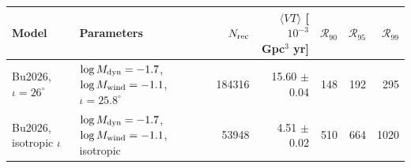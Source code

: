 \begin{tabular}{llrrrrr}
\toprule
Model & Parameters & $N_{\rm rec}$ & $\langle VT\rangle$ [$10^{-3}$ Gpc$^3$ yr] & $\mathcal{R}_{90}$ & $\mathcal{R}_{95}$ & $\mathcal{R}_{99}$ \\
\midrule
Bu2026, $\iota=26^\circ$ & $\log M_{\rm dyn}=-1.7$, $\log M_{\rm wind}=-1.1$, $\iota=25.8^\circ$ & 184316 & 15.60 $\pm$ 0.04 & 148 & 192 & 295 \\
Bu2026, isotropic $\iota$ & $\log M_{\rm dyn}=-1.7$, $\log M_{\rm wind}=-1.1$, isotropic & 53948 & 4.51 $\pm$ 0.02 & 510 & 664 & 1020 \\
\bottomrule
\end{tabular}
